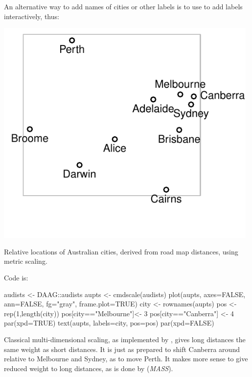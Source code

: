 \noindent
An alternative way to add names of cities or other labels is to use
 to add labels interactively, thus:


\begin{marginfigure}
\begin{Schunk}


\centerline{\includegraphics[width=0.98\textwidth]{figs/9-aupoints-1} }

\end{Schunk}
\caption{Relative locations of Australian cities, derived from road
  map distances, using metric scaling.\label{fig:audists}}
\end{marginfigure}
Code is:
\begin{Schunk}
\begin{Sinput}
audists <- DAAG::audists
aupts <- cmdscale(audists)
plot(aupts, axes=FALSE, ann=FALSE, fg="gray",
     frame.plot=TRUE)
city <- rownames(aupts)
pos <- rep(1,length(city))
pos[city=="Melbourne"]<- 3
pos[city=="Canberra"] <- 4
par(xpd=TRUE)
text(aupts, labels=city, pos=pos)
par(xpd=FALSE)
\end{Sinput}
\end{Schunk}


Classical multi-dimensional scaling, as implemented by
 , gives long distances the same weight as short
 distances.  It is just as prepared to shift Canberra around relative
 to Melbourne and Sydney, as to move Perth.  It makes more sense to
 give reduced weight to long distances, as is done by 
 (\textit{MASS}).



